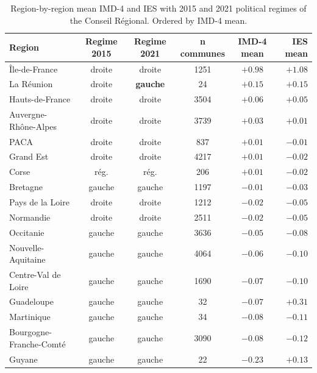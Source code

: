 \documentclass[11pt,a4paper]{article}
\begin{document}
\begin{table}[H]
\centering
\caption{Region-by-region mean IMD-4 and IES with 2015 and 2021
political regimes of the Conseil R\'egional.  Ordered by IMD-4
mean.}
\label{tab:regional}
\small
\begin{tabular}{@{}lccccr@{}}
\toprule
Region & Regime 2015 & Regime 2021 & n communes & IMD-4 mean & IES mean \\
\midrule
\^Ile-de-France                & droite       & droite       &  1251 & $+0.98$ & $+1.08$ \\
La R\'eunion                   & droite       & \textbf{gauche} & 24 & $+0.15$ & $+0.15$ \\
Hauts-de-France                & droite       & droite       &  3504 & $+0.06$ & $+0.05$ \\
Auvergne-Rh\^one-Alpes         & droite       & droite       &  3739 & $+0.03$ & $+0.01$ \\
PACA                           & droite       & droite       &   837 & $+0.01$ & $-0.01$ \\
Grand Est                      & droite       & droite       &  4217 & $+0.01$ & $-0.02$ \\
Corse                          & r\'eg.       & r\'eg.       &   206 & $+0.01$ & $-0.02$ \\
Bretagne                       & gauche       & gauche       &  1197 & $-0.01$ & $-0.03$ \\
Pays de la Loire               & droite       & droite       &  1212 & $-0.02$ & $-0.05$ \\
Normandie                      & droite       & droite       &  2511 & $-0.02$ & $-0.05$ \\
Occitanie                      & gauche       & gauche       &  3636 & $-0.05$ & $-0.08$ \\
Nouvelle-Aquitaine             & gauche       & gauche       &  4064 & $-0.06$ & $-0.10$ \\
Centre-Val de Loire            & gauche       & gauche       &  1690 & $-0.07$ & $-0.10$ \\
Guadeloupe                     & gauche       & gauche       &    32 & $-0.07$ & $+0.31$ \\
Martinique                     & gauche       & gauche       &    34 & $-0.08$ & $-0.11$ \\
Bourgogne-Franche-Comt\'e      & gauche       & gauche       &  3090 & $-0.08$ & $-0.12$ \\
Guyane                         & gauche       & gauche       &    22 & $-0.23$ & $+0.13$ \\
\bottomrule
\end{tabular}
\end{table}


\end{document}
